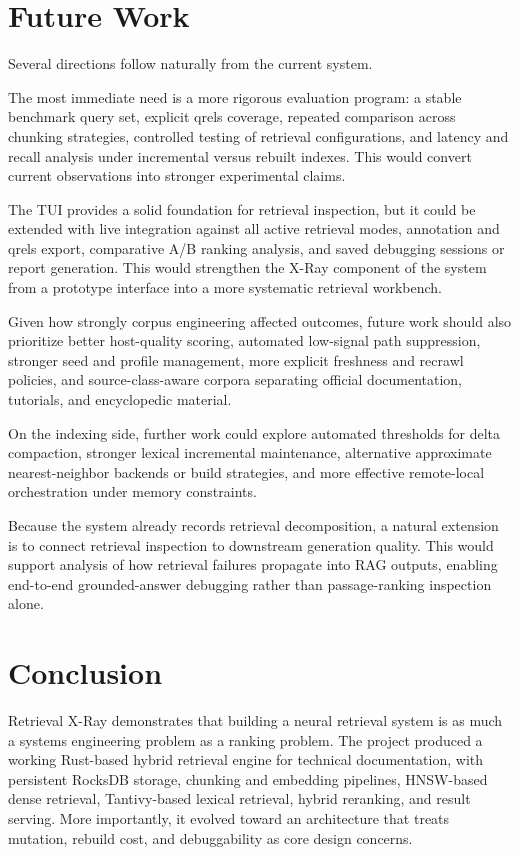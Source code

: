 \documentclass[conference]{IEEEtran}
\newcommand{\system}{Retrieval X-Ray\xspace}
\begin{document}
\section{Future Work}
Several directions follow naturally from the current system.

The most immediate need is a more rigorous evaluation program: a stable benchmark query set, explicit qrels coverage, repeated comparison across chunking strategies, controlled testing of retrieval configurations, and latency and recall analysis under incremental versus rebuilt indexes. This would convert current observations into stronger experimental claims.

The TUI provides a solid foundation for retrieval inspection, but it could be extended with live integration against all active retrieval modes, annotation and qrels export, comparative A/B ranking analysis, and saved debugging sessions or report generation. This would strengthen the X-Ray component of the system from a prototype interface into a more systematic retrieval workbench.

Given how strongly corpus engineering affected outcomes, future work should also prioritize better host-quality scoring, automated low-signal path suppression, stronger seed and profile management, more explicit freshness and recrawl policies, and source-class-aware corpora separating official documentation, tutorials, and encyclopedic material.

On the indexing side, further work could explore automated thresholds for delta compaction, stronger lexical incremental maintenance, alternative approximate nearest-neighbor backends or build strategies, and more effective remote-local orchestration under memory constraints.

Because the system already records retrieval decomposition, a natural extension is to connect retrieval inspection to downstream generation quality. This would support analysis of how retrieval failures propagate into RAG outputs, enabling end-to-end grounded-answer debugging rather than passage-ranking inspection alone.

\section{Conclusion}
\system demonstrates that building a neural retrieval system is as much a systems engineering problem as a ranking problem. The project produced a working Rust-based hybrid retrieval engine for technical documentation, with persistent RocksDB storage, chunking and embedding pipelines, HNSW-based dense retrieval, Tantivy-based lexical retrieval, hybrid reranking, and result serving. More importantly, it evolved toward an architecture that treats mutation, rebuild cost, and debuggability as core design concerns.
\end{document}
